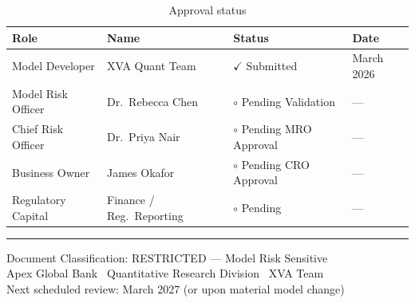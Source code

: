 \documentclass[11pt,a4paper]{article}
\begin{document}
\begin{table}[h!]
\centering
\begin{tabular}{@{}llll@{}}
\toprule
\textbf{Role} & \textbf{Name} & \textbf{Status} & \textbf{Date} \\
\midrule
Model Developer       & XVA Quant Team      & $\checkmark$ Submitted    & March 2026 \\
Model Risk Officer    & Dr.\ Rebecca Chen   & $\circ$ Pending Validation & --- \\
Chief Risk Officer    & Dr.\ Priya Nair     & $\circ$ Pending MRO Approval & --- \\
Business Owner        & James Okafor        & $\circ$ Pending CRO Approval & --- \\
Regulatory Capital    & Finance / Reg.\ Reporting & $\circ$ Pending    & --- \\
\bottomrule
\end{tabular}
\caption{Approval status}
\end{table}

\vspace{2em}
\hrule
\vspace{0.5em}
{\small\color{apexgray}
Document Classification: RESTRICTED --- Model Risk Sensitive\\
Apex Global Bank \textbar\ Quantitative Research Division \textbar\ XVA Team\\
Next scheduled review: March 2027 (or upon material model change)
}
\end{document}
